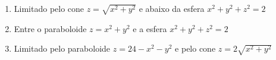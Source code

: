 	\begin{enumerate}[resume]
	
		\item Limitado pelo cone $z = \sqrt{x^2 + y^2}$ e abaixo da esfera $x^2 + y^2 + z^2 = 2$
		
		\item Entre o paraboloide $z = x^2 + y^2$ e a esfera $x^2 + y^2 + z^2 = 2$
		
		\item Limitado pelo paraboloide $z = 24 - x^2 - y^2$ e pelo cone $z = 2\sqrt{x^2 + y^2}$
		
	\end{enumerate}
		
	\vspace{5mm}	
	
	



